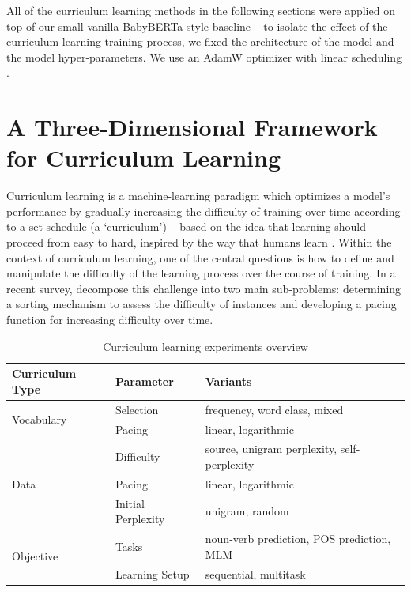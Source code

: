 All of the curriculum learning methods in the following sections were applied on top of our small vanilla BabyBERTa-style baseline -- to isolate the effect of the curriculum-learning training process, we fixed the architecture of the model and the model hyper-parameters. We use an AdamW optimizer with linear scheduling \cite{loshchilov2019decoupled}.

\section{A Three-Dimensional Framework for Curriculum Learning}
Curriculum learning \cite{bengio2009curriculum} is a machine-learning paradigm which optimizes a model's performance by gradually increasing the difficulty of training over time according to a set schedule (a `curriculum') -- based on the idea that learning should proceed from easy to hard, inspired by the way that humans learn \cite{elman1993learning}.
Within the context of curriculum learning, one of the central questions is how to define and manipulate the difficulty of the learning process over the course of training. In a recent survey, \citet{soviany2022curriculum} decompose this challenge into two main sub-problems: determining a sorting mechanism to assess the difficulty of instances and developing a pacing function for increasing difficulty over time. 

\begin{table}[H]
    \centering
    \small
    \begin{tabular}{lll}
    \toprule
    \textbf{Curriculum Type} & \textbf{Parameter} &\textbf{Variants} \\
    \midrule
     \multirow{2}{*}{Vocabulary} & Selection & frequency, word class, mixed \\
     & Pacing & linear, logarithmic \\
     \midrule
     \multirow{3}{*}{Data} & Difficulty & source, unigram perplexity, self-perplexity \\
     & Pacing & linear, logarithmic \\
     & Initial Perplexity & unigram, random \\
      \midrule
     \multirow{2}{*}{Objective} & Tasks & noun-verb prediction, POS prediction, MLM\\
     & Learning Setup & sequential, multitask \\
    \bottomrule
    \end{tabular}
    \caption{\label{tbl:configurations} Curriculum learning experiments overview}
\end{table}

